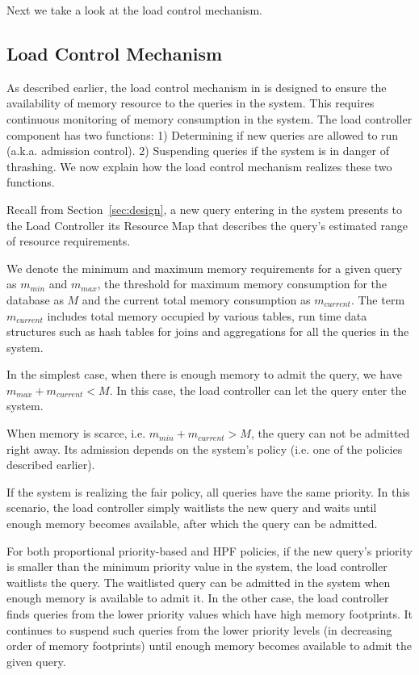 Next we take a look at the load control mechanism. %
\subsection{Load Control Mechanism}\label{ssec:load-control-mech}
As described earlier, the load control mechanism in \sys{} is designed to ensure the availability of memory resource to the queries in the system.
This requires continuous monitoring of memory consumption in the system.
The load controller component has two functions:
1) Determining if new queries are allowed to run (a.k.a. admission control).
2) Suspending queries if the system is in danger of thrashing.
We now explain how the load control mechanism realizes these two functions.


Recall from Section~\ref{sec:design}, a new query entering in the system presents to the Load Controller its Resource Map that describes the query's estimated range of resource requirements.

We denote the minimum and maximum memory requirements for a given query as $m_{min}$ and $m_{max}$, the threshold for maximum memory consumption for the database as $M$ and the current total memory consumption as $m_{current}$. 
The term $m_{current}$ includes total memory occupied by various tables, run time data structures such as hash tables for joins and aggregations for all the queries in the system.

In the simplest case, when there is enough memory to admit the query, we have $m_{max} + m_{current} < M$. 
In this case, the load controller can let the query enter the system.

When memory is scarce, i.e. $m_{min}+m_{current}>M$, the query can not be admitted right away. 
Its admission depends on the system's policy (i.e. one of the policies described earlier).

If the system is realizing the fair policy, all queries have the same priority.
In this scenario, the load controller simply waitlists the new query and waits until enough memory becomes available, after which the query can be admitted.

For both proportional priority-based and HPF policies, if the new query's priority is smaller than the minimum priority value in the system, the load controller waitlists the query. 
The waitlisted query can be admitted in the system when enough memory is available to admit it.
In the other case, the load controller finds queries from the lower priority values which have high memory footprints. 
It continues to suspend such queries from the lower priority levels (in decreasing order of memory footprints) until enough memory becomes available to admit the given query. 

